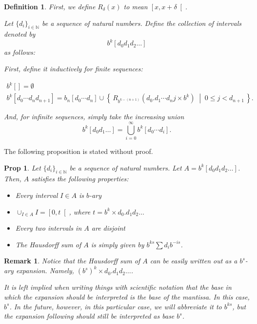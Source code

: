 \documentclass[11pt, reqno]{amsart}
\newcommand{\N}{\mathbb{N}}
\newtheorem{prop}{Prop}
\newtheorem{definition}{Definition}
\newtheorem{remark}{Remark}
\begin{document}
\begin{definition}
First, we define $R_\delta(x)$ to mean $\left[x, x+\delta \right[$.

Let $\{d_i\}_{i \in \N}$ be a sequence of natural numbers. Define the collection of intervals denoted by
\[ b^k [d_0 d_1 d_2 \dots] \]
as follows:

First, define it inductively for finite sequences:

\begin{gather*}
b^k [] = \emptyset\\
b^k [d_0 \cdots d_n d_{n+1}] = b_n [d_0 \cdots d_n] \cup \left\{\, R_{b^{k-(n+1)}}(d_0 . d_1 \cdots d_n j \times b^k) \;\middle|\; 0 \leq j < d_{n+1} \,\right\}.
\end{gather*}

And, for infinite sequences, simply take the increasing union
\[ b^k[d_0 d_1 \dots] = \bigcup_{i = 0}^\infty b^k[d_0 \cdots d_i].\]

\end{definition}

The following proposition is stated without proof.

\begin{prop}
Let $\{d_i\}_{i \in \N}$ be a sequence of natural numbers. Let $A = b^k [d_0 d_1 d_2 \dots]$. Then, $A$ satisfies the following properties:

\begin{itemize}
\item Every interval $I \in A$ is $b$-ary

\item $\cup_{I \in A} I = \left[ 0, t \right[$, where $t = b^k \times d_0 . d_1 d_2 \dots$

\item Every two intervals in $A$ are disjoint

\item The Hausdorff sum of $A$ is simply given by $b^{ks} \sum d_i b^{-is}$.
\end{itemize}

\end{prop}

\begin{remark}
Notice that the Hausdorff sum of $A$ can be easily written out as a $b^s$-ary expansion. Namely, $(b^s)^k \times d_0 . d_1 d_ 2 \dots$.

It is left implied when writing things with scientific notation that the base in which the expansion should be interpreted is the base of the mantissa. In this case, $b^s$. In the future, however, in this particular case, we will abbreviate it to $b^{ks}$, but the expansion following should still be interpreted as base $b^s$.
\end{remark}
\end{document}
